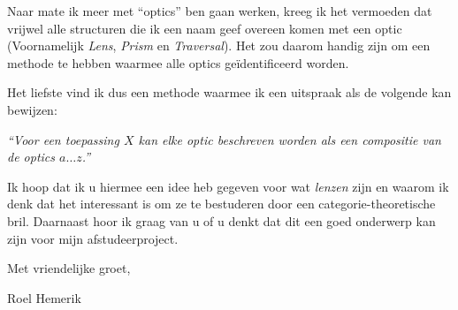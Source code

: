 \documentclass{article}
\begin{document}
Naar mate ik meer met ``optics'' ben gaan werken, kreeg ik het vermoeden dat vrijwel alle structuren die ik een naam geef overeen komen met een optic (Voornamelijk \emph{Lens}, \emph{Prism} en \emph{Traversal}). Het zou daarom handig zijn om een methode te hebben waarmee alle optics geïdentificeerd worden.

Het liefste vind ik dus een methode waarmee ik een uitspraak als de volgende kan bewijzen:


\begin{center}
	\emph{``Voor een toepassing $X$ kan elke \emph{optic} beschreven worden als een compositie van de \emph{optics} $a\ldots z$.''}	
\end{center}


\vspace{4em}


\noindent Ik hoop dat ik u hiermee een idee heb gegeven voor wat \emph{lenzen} zijn en waarom ik denk dat het interessant is om ze te bestuderen door een categorie-theoretische bril. Daarnaast hoor ik graag van u of u denkt dat dit een goed onderwerp kan zijn voor mijn afstudeerproject.

\bigskip
 

\noindent Met vriendelijke groet,

\vspace{4em}

\noindent Roel Hemerik

\end{document}
